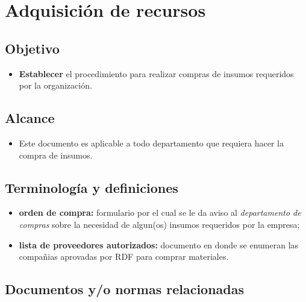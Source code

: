 \renewcommand{\MayorVer}{2}
\renewcommand{\MenorVer}{1}
\renewcommand{\Codigo}{BPD-10-PRO}
\renewcommand{\FechaPub}{2023--01}
\renewcommand{\Titulo}{Adquisición de recursos}
\section{\Titulo}


\subsection{Objetivo}

\begin{itemize}
	\item \textbf{Establecer} el procedimiento para realizar compras de insumos requeridos por la organización.
\end{itemize}

\subsection{Alcance}

\begin{itemize}
	\item Este documento es aplicable a todo departamento que requiera hacer la compra de insumos.
\end{itemize}

\subsection{Terminología y definiciones}

\begin{itemize}
	\item \textbf{orden de compra:} formulario por el cual se le da aviso al \emph{departamento de compras} sobre la necesidad de algun(os) insumos requeridos por la empresa;
	\item \textbf{lista de proveedores autorizados:} documento en donde se enumeran las compañias aprovadas por RDF para comprar materiales.
\end{itemize}

\subsection{Documentos y/o normas relacionadas}

